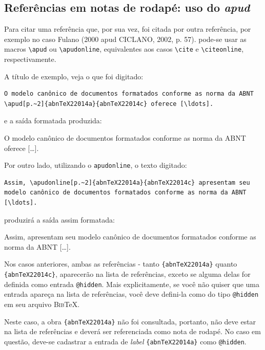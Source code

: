 \begin{apendicesenv}
\subsection{Referências em notas de rodapé: uso do \textit{apud}}
\label{subsec:refRodape}


Para citar uma referência que, por sua vez, foi citada por outra referência, por exemplo no caso Fulano (2000 apud CICLANO, 2002, p. 57). pode-se usar as macros \verb|\apud| ou \verb|\apudonline|, equivalentes aos casos \verb|\cite| e \verb|\citeonline|, respectivamente.

A título de exemplo, veja o que foi digitado: 

\begin{verbatim}
O modelo canônico de documentos formatados conforme as norma da ABNT
\apud[p.~2]{abnTeX22014a}{abnTeX22014c} oferece [\ldots].
\end{verbatim}

e a saída formatada produzida:

O modelo canônico de documentos formatados conforme as norma da ABNT  oferece [\ldots].

Por outro lado, utilizando o \verb|apudonline|, o texto digitado:

\begin{verbatim}
Assim, \apudonline[p.~2]{abnTeX22014a}{abnTeX22014c} apresentam seu
modelo canônico de documentos formatados conforme as norma da ABNT [\ldots].
\end{verbatim}

produzirá a saída assim formatada:

Assim,  apresentam seu modelo canônico de documentos formatados conforme as norma da ABNT [\ldots].


Nos casos anteriores, ambas as referências - tanto \verb|{abnTeX22014a}| quanto \verb|{abnTeX22014c}|, aparecerão na lista de referências, exceto se alguma delas for definida como entrada \texttt{@hidden}. Mais explicitamente, se você não quiser que uma entrada apareça na lista de referências, você deve defini-la como do tipo \texttt{@hidden} em seu arquivo \textsc{Bib}\TeX{}.

Neste caso, a obra \verb|{abnTeX22014a}| não foi consultada, portanto, não deve estar na lista de referências e deverá ser referenciada como nota de rodapé. No caso em questão, deve-se cadastrar a entrada de \textit{label} \verb|{abnTeX22014a}| como \texttt{@hidden}.


\end{apendicesenv}
